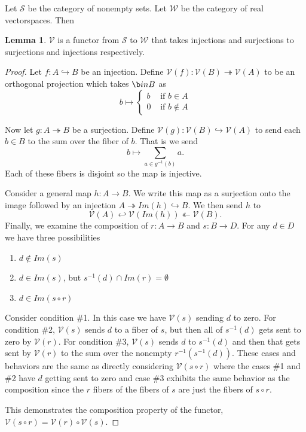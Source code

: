 \documentclass[12pt,a4paper]{article}
\theoremstyle{myrule}
\theoremstyle{postulate}
\theoremstyle{definition}
\newtheorem{lemma}[theorem]{Lemma}
\begin{document}
Let $\mathcal{S}$ be the category of nonempty sets.  Let $\mathcal{W}$ be the category of real vectorspaces.  Then
\begin{lemma}
$\mathcal{V}$ is a functor from $\mathcal{S}$ to $\mathcal{W}$ that takes injections and surjections to surjections and injections respectively.
\end{lemma}
\begin{proof}
  Let $f:A \hookrightarrow B$ be an injection.  Define $\mathcal{V}(f):\mathcal{V}(B) \twoheadrightarrow \mathcal{V}(A)$ to be an orthogonal projection which takes $\b in B$ as
  \[
     b \mapsto \left\{ \begin{array}{cc} b & \text{ if } b \in A \\ 0 & \text{ if } b \not \in A  \end{array} \right.
  \]

  Now let $g:A \twoheadrightarrow B$ be a surjection.  Define $\mathcal{V}(g):\mathcal{V}(B) \hookrightarrow  \mathcal{V}(A)$ to send each $b \in B$ to the sum over the fiber of $b$.  That is we send
  \[
  b \mapsto \sum_{a \in g^{-1}(b)} a.
\]
  Each of these fibers is disjoint so the map is injective.

  Consider a general map $h:A \rightarrow B$.  We write this map as a surjection onto the image followed by an injection  $A \twoheadrightarrow Im(h) \hookrightarrow B$.  We then send $h$ to
 \[
 \mathcal{V}(A) \hookleftarrow \mathcal{V}(Im(h)) \twoheadleftarrow \mathcal{V}(B).
 \]
  Finally, we examine the composition of $r:A \rightarrow B$ and $s:B\rightarrow D$.  For any $d \in D$ we have three possibilities
  \begin{enumerate}
  \item $d \not \in Im(s)$
  \item $d \in Im(s)$, but $s^{-1}(d) \cap Im(r) = \emptyset$
  \item $d \in Im(s \circ r)$
  \end{enumerate}
  Consider condition \#1.  In this case we have $\mathcal{V}(s)$ sending $d$ to zero.  For condition \#2, $\mathcal{V}(s)$ sends $d$ to a fiber of $s$, but then all of $s^{-1}(d)$ gets sent to zero by $\mathcal{V}(r)$.  For condition \#3, $\mathcal{V}(s)$ sends $d$ to $s^{-1}(d)$ and then that gets sent by $\mathcal{V}(r)$ to the sum over the nonempty $r^{-1}(s^{-1}(d))$.  These cases and behaviors are the same as directly considering $\mathcal{V}(s \circ r)$ where the cases \#1 and \#2 have $d$ getting sent to zero and case \#3 exhibits the same behavior as the composition since the $r$ fibers of the fibers of $s$ are just the fibers of $s \circ r$.

  This demonstrates the composition property of the functor, $\mathcal{V}(s \circ r) = \mathcal{V}(r) \circ \mathcal{V}(s)$. 
\end{proof}
\end{document}
